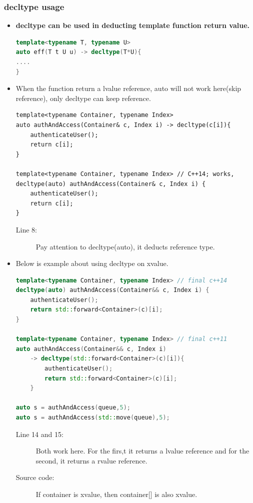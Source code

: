 \documentclass[a4paper,11pt,twoside]{book}
\begin{document}
\subsubsection{decltype usage}
\begin{itemize}
	\item \textbf{decltype can be used in deducting template function return value.}
\begin{lstlisting}[frame=single, language=c++, mathescape=true]
template<typename T, typename U>
auto eff(T t U u) -> decltype(T*U){
....
}
\end{lstlisting}
	\item When the function return a lvalue reference, auto will not work here(skip reference), only decltype can keep reference.
\begin{lstlisting}
template<typename Container, typename Index>
auto authAndAccess(Container& c, Index i) -> decltype(c[i]){
	authenticateUser();
	return c[i];
}

template<typename Container, typename Index> // C++14; works,
decltype(auto) authAndAccess(Container& c, Index i) {
	authenticateUser();
	return c[i];
}
\end{lstlisting}
\begin{description}
	\item[Line 8:] Pay attention to decltype(auto), it deducts reference type.
\end{description}
	
	\item Below is example about using decltype on xvalue. 
\begin{lstlisting}[frame=single, language=c++, mathescape=true]
template<typename Container, typename Index> // final c++14
decltype(auto) authAndAccess(Container&& c, Index i) {
	authenticateUser();
	return std::forward<Container>(c)[i];
}
	
template<typename Container, typename Index> // final c++11
auto authAndAccess(Container&& c, Index i)
	-> decltype(std::forward<Container>(c)[i]){
		authenticateUser();
		return std::forward<Container>(c)[i];
	}

auto s = authAndAccess(queue,5);
auto s = authAndAccess(std::move(queue),5); 
\end{lstlisting}
\begin{description}
	\item[Line 14 and 15:] Both work here. For the firs,t it returns a lvalue reference and for the second, it returns a rvalue reference.
	\item[Source code:] If container is xvalue, then container[] is also xvalue. 
\end{description}
	

\end{itemize}
\end{document}
